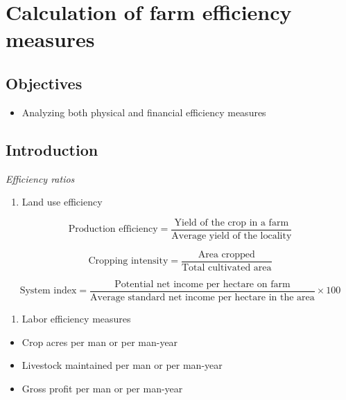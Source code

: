 \documentclass[
]{article}
\providecommand{\tightlist}{%
  \setlength{\itemsep}{0pt}\setlength{\parskip}{0pt}}
\begin{document}
\clearpage

\hypertarget{calculation-of-farm-efficiency-measures}{%
\section{Calculation of farm efficiency measures}\label{calculation-of-farm-efficiency-measures}}

\hypertarget{objectives-7}{%
\subsection*{Objectives}\label{objectives-7}}

\begin{itemize}
\tightlist
\item
  Analyzing both physical and financial efficiency measures
\end{itemize}

\hypertarget{introduction-3}{%
\subsection*{Introduction}\label{introduction-3}}

\emph{Efficiency ratios}

\begin{enumerate}
\def\labelenumi{\arabic{enumi}.}
\tightlist
\item
  Land use efficiency
\end{enumerate}

\[\text{Production efficiency} = \frac{\text{Yield of the crop in a farm}}{\text{Average yield of the locality}}\]

\[\text{Cropping intensity} = \frac{\text{Area cropped}}{\text{Total cultivated area}}\]

\[\text{System index} = \frac{\text{Potential net income per hectare on farm}}{\text{Average standard net income per hectare in the area}} \times 100\]

\begin{enumerate}
\def\labelenumi{\arabic{enumi}.}
\setcounter{enumi}{1}
\tightlist
\item
  Labor efficiency measures
\end{enumerate}

\begin{itemize}
\tightlist
\item
  Crop acres per man or per man-year
\item
  Livestock maintained per man or per man-year
\item
  Gross profit per man or per man-year
\end{itemize}
\end{document}
